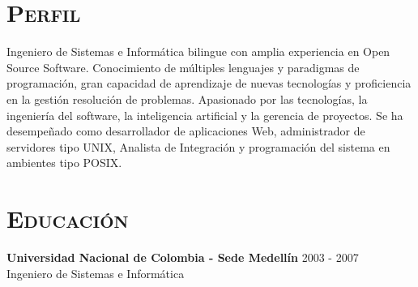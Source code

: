 \begin{resume}


\section{\textsc{Perfil}}
Ingeniero de Sistemas e Inform\'{a}tica bilingue con amplia
experiencia en Open Source Software.  Conocimiento de m\'{u}ltiples
lenguajes y paradigmas de programaci\'{o}n, gran capacidad de
aprendizaje de nuevas tecnolog\'{i}as y proficiencia en la gesti\'{o}n
resoluci\'{o}n de problemas.  Apasionado por las tecnolog\'{i}as, la
ingenier\'{i}a del software, la inteligencia artificial  y la gerencia
de proyectos. Se ha desempeñado como desarrollador de aplicaciones
Web, administrador de servidores tipo UNIX, Analista de Integraci\'{o}n y programaci\'{o}n del sistema en ambientes tipo POSIX.




\section{\textsc{Educaci\'{o}n}}
\textbf{Universidad Nacional de Colombia  - Sede  Medell\'{i}n} \hfill 2003 - 2007 \\
{Ingeniero de Sistemas e Inform\'{a}tica } \hfill


\end{resume}
